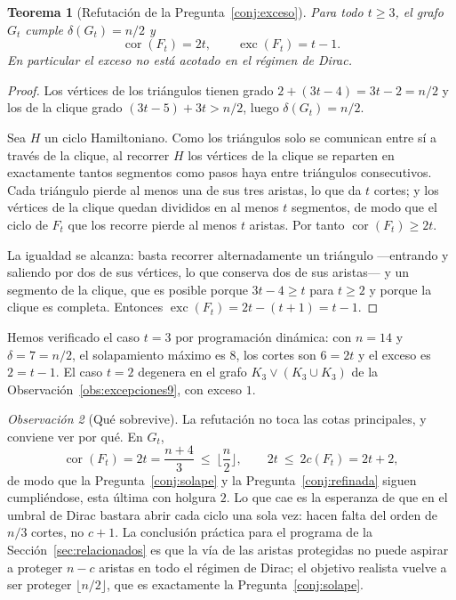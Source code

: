 \documentclass[11pt,a4paper]{article}
\newtheorem{teorema}{Teorema}[section]
\theoremstyle{definition}
\theoremstyle{remark}
\newtheorem{observacion}[teorema]{Observación}
\begin{document}
\begin{teorema}[Refutación de la Pregunta~\ref{conj:exceso}]\label{thm:excesofalso}
Para todo $t\ge3$, el grafo $G_t$ cumple $\delta(G_t)=n/2$ y
\[
\operatorname{cor}(F_t)=2t,\qquad \operatorname{exc}(F_t)=t-1 .
\]
En particular el exceso no está acotado en el régimen de Dirac.
\end{teorema}

\begin{proof}
Los vértices de los triángulos tienen grado $2+(3t-4)=3t-2=n/2$ y los de la clique grado $(3t-5)+3t>n/2$, luego $\delta(G_t)=n/2$.

Sea $H$ un ciclo Hamiltoniano. Como los triángulos solo se comunican entre sí a través de la clique, al recorrer $H$ los vértices de la clique se reparten en exactamente tantos segmentos como pasos haya entre triángulos consecutivos. Cada triángulo pierde al menos una de sus tres aristas, lo que da $t$ cortes; y los vértices de la clique quedan divididos en al menos $t$ segmentos, de modo que el ciclo de $F_t$ que los recorre pierde al menos $t$ aristas. Por tanto $\operatorname{cor}(F_t)\ge2t$.

La igualdad se alcanza: basta recorrer alternadamente un triángulo —entrando y saliendo por dos de sus vértices, lo que conserva dos de sus aristas— y un segmento de la clique, que es posible porque $3t-4\ge t$ para $t\ge2$ y porque la clique es completa. Entonces $\operatorname{exc}(F_t)=2t-(t+1)=t-1$.
\end{proof}

Hemos verificado el caso $t=3$ por programación dinámica: con $n=14$ y $\delta=7=n/2$, el solapamiento máximo es $8$, los cortes son $6=2t$ y el exceso es $2=t-1$. El caso $t=2$ degenera en el grafo $K_3\vee(K_3\cup K_3)$ de la Observación~\ref{obs:excepciones9}, con exceso $1$.

\begin{observacion}[Qué sobrevive]\label{obs:sobrevive}
La refutación no toca las cotas principales, y conviene ver por qué. En $G_t$,
\[
\operatorname{cor}(F_t)=2t=\frac{n+4}{3}\ \le\ \Big\lfloor\frac n2\Big\rfloor,
\qquad
2t\ \le\ 2c(F_t)=2t+2 ,
\]
de modo que la Pregunta~\ref{conj:solape} y la Pregunta~\ref{conj:refinada} siguen cumpliéndose, esta última con holgura $2$. Lo que cae es la esperanza de que en el umbral de Dirac bastara abrir cada ciclo una sola vez: hacen falta del orden de $n/3$ cortes, no $c+1$. La conclusión práctica para el programa de la Sección~\ref{sec:relacionados} es que la vía de las aristas protegidas no puede aspirar a proteger $n-c$ aristas en todo el régimen de Dirac; el objetivo realista vuelve a ser proteger $\lfloor n/2\rfloor$, que es exactamente la Pregunta~\ref{conj:solape}.
\end{observacion}
\end{document}
